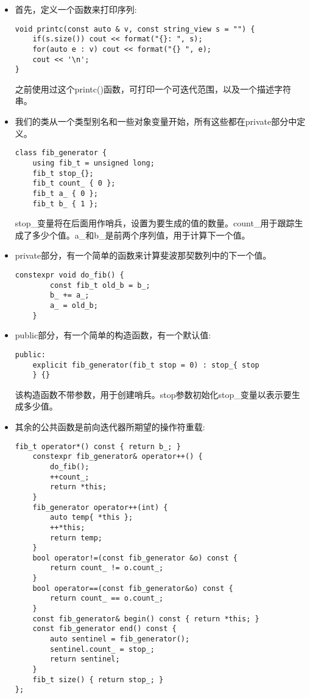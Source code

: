 \begin{itemize}
\item 
首先，定义一个函数来打印序列:

\begin{lstlisting}[style=styleCXX]
void printc(const auto & v, const string_view s = "") {
	if(s.size()) cout << format("{}: ", s);
	for(auto e : v) cout << format("{} ", e);
	cout << '\n';
}
\end{lstlisting}

之前使用过这个printc()函数，可打印一个可迭代范围，以及一个描述字符串。

\item 
我们的类从一个类型别名和一些对象变量开始，所有这些都在private部分中定义。

\begin{lstlisting}[style=styleCXX]
class fib_generator {
	using fib_t = unsigned long;
	fib_t stop_{};
	fib_t count_ { 0 };
	fib_t a_ { 0 };
	fib_t b_ { 1 };
\end{lstlisting}

stop\_变量将在后面用作哨兵，设置为要生成的值的数量。count\_用于跟踪生成了多少个值。a\_和b\_是前两个序列值，用于计算下一个值。

\item 
private部分，有一个简单的函数来计算斐波那契数列中的下一个值。

\begin{lstlisting}[style=styleCXX]
	constexpr void do_fib() {
		const fib_t old_b = b_;
		b_ += a_;
		a_ = old_b;
	}
\end{lstlisting}

\item 
public部分，有一个简单的构造函数，有一个默认值:

\begin{lstlisting}[style=styleCXX]
public:
	explicit fib_generator(fib_t stop = 0) : stop_{ stop
	} {}
\end{lstlisting}

该构造函数不带参数，用于创建哨兵。stop参数初始化stop\_变量以表示要生成多少值。

\item 
其余的公共函数是前向迭代器所期望的操作符重载:

\begin{lstlisting}[style=styleCXX]
	fib_t operator*() const { return b_; }
	constexpr fib_generator& operator++() {
		do_fib();
		++count_;
		return *this;
	}
	fib_generator operator++(int) {
		auto temp{ *this };
		++*this;
		return temp;
	}
	bool operator!=(const fib_generator &o) const {
		return count_ != o.count_;
	}
	bool operator==(const fib_generator&o) const {
		return count_ == o.count_;
	}
	const fib_generator& begin() const { return *this; }
	const fib_generator end() const {
		auto sentinel = fib_generator();
		sentinel.count_ = stop_;
		return sentinel;
	}
	fib_t size() { return stop_; }
};
\end{lstlisting}


\end{itemize}
